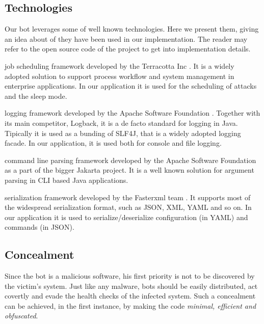 \subsection{Technologies}
\label{sec:technologies}

Our bot leverages some of well known technologies. Here we present them, giving an idea about of they have been used in our implementation. The reader may refer to the open source code of the project to get into implementation details.

\begin{description}
  \setlength\itemsep{1em}
  \item[QUARTZ] job scheduling framework developed by the Terracotta Inc \cite{quartz-scheduler}.
  It is a widely adopted solution to support process workflow and system management in enterprise applications.
  In our application it is used for the scheduling of attacks and the sleep mode.

  \item[LOG4J2] logging framework developed by the Apache Software Foundation \cite{log4j2}.
  Together with its main competitor, Logback, it is a de facto standard for logging in Java. Tipically it is used as a bunding of SLF4J, that is a widely adopted logging facade.
  In our application, it is used both for console and file logging.

  \item[COMMONS CLI] command line parsing framework developed by the Apache Software Foundation as a part of the bigger Jakarta project\cite{commons-cli}.
  It is a well known solution for argument parsing in CLI based Java applications.

  \item[JACKSON] serialization framework developed by the Fasterxml team \cite{jackson,fasterxml}.
  It supports most of the widespread serialization format, such as JSON, XML, YAML and so on.
  In our application it is used to serialize/deserialize configuration (in YAML) and commands (in JSON).

\end{description}


\subsection{Concealment}
\label{sec:concealment}

Since the bot is a malicious software, his first priority is not to be discovered by the victim's system. Just like any malware, bots should be easily distributed, act covertly and evade the health checks of the infected system. Such a concealment can be achieved, in the first instance, by making the code \textit{minimal, efficient and obfuscated}.

